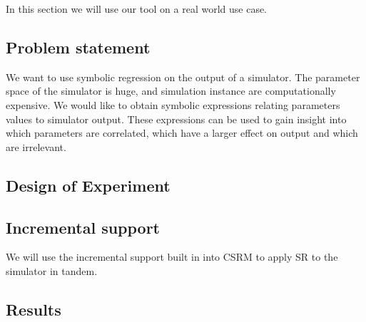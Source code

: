 In this section we will use our tool on a real world use case. %
\subsection{Problem statement}
We want to use symbolic regression on the output of a simulator. The parameter space of the simulator is huge, and simulation instance are computationally expensive. We would like to obtain symbolic expressions relating parameters values to simulator output. These expressions can be used to gain insight into which parameters are correlated, which have a larger effect on output and which are irrelevant.
\subsection{Design of Experiment}
\subsection{Incremental support}
We will use the incremental support built in into CSRM to apply SR to the simulator in tandem. 
\subsection{Results}
